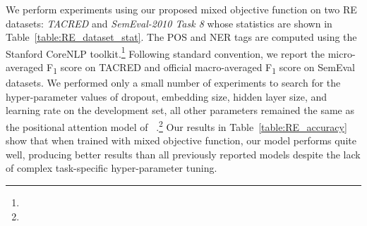 \documentclass[letterpaper]{article}
\newcommand{\citet}[1]{\citeauthor{#1} \shortcite{#1}}
\begin{document}
We perform experiments using our proposed mixed objective function on two RE datasets: \emph{TACRED} and \emph{SemEval-2010 Task 8} whose statistics are shown in Table~\ref{table:RE_dataset_stat}. The POS and NER tags are computed using the Stanford CoreNLP toolkit.\footnote{\corenlpurl} Following standard convention, we report the micro-averaged F\textsubscript{1} score on TACRED and official macro-averaged F\textsubscript{1} score on SemEval datasets. We performed only a small number of experiments to search for the hyper-parameter values of dropout, embedding size, hidden layer size, and learning rate on the development set, all other parameters remained the same as the positional attention model of~\citet{yuhao2017slot}.\footnote{\parelexturl} Our results in Table~\ref{table:RE_accuracy} show that when trained with mixed objective function, our model performs quite well, producing better results than all previously reported models despite the lack of complex task-specific hyper-parameter tuning.
\end{document}

